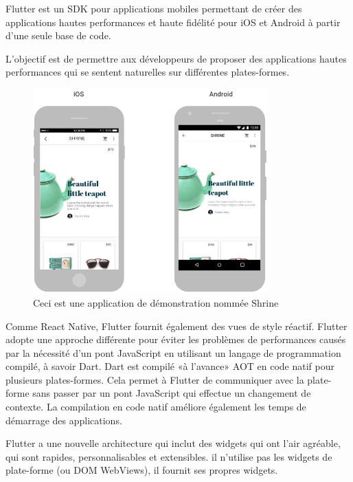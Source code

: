 Flutter est un SDK pour applications mobiles permettant de créer des applications hautes performances et haute fidélité pour iOS et Android à partir d'une seule base de code\cite{noauthor_technical_nodate}.\medskip

L'objectif est de permettre aux développeurs de proposer des applications hautes performances qui se sentent naturelles sur différentes plates-formes.\bigskip

\begin{figure}[h]
	\begin{center}
		\includegraphics[width=9cm]{Images/chapter2/flutter_android_ios.png}
		\caption{{\footnotesize Ceci est une application de démonstration nommée Shrine\cite{noauthor_technical_nodate}}}
	\end{center}
\end{figure}

Comme React Native, Flutter fournit également des vues de style réactif. Flutter adopte une approche différente pour éviter les problèmes de performances causés par la nécessité d'un pont JavaScript en utilisant un langage de programmation compilé, à savoir Dart. Dart est compilé «à l'avance» \acrshort{AOT} en code natif pour plusieurs plates-formes. Cela permet à Flutter de communiquer avec la plate-forme sans passer par un pont JavaScript qui effectue un changement de contexte. La compilation en code natif améliore également les temps de démarrage des applications.\medskip

Flutter a une nouvelle architecture qui inclut des widgets qui ont l’air agréable, qui sont rapides, personnalisables et extensibles. il n'utilise pas les widgets de plate-forme (ou DOM WebViews), il fournit ses propres widgets.

